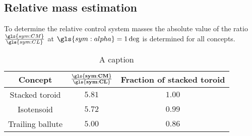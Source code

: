 \subsection{Relative mass estimation}
\label{subsec:controlmassest}
To determine the relative control system masses the absolute value of the ratio $\frac{\gls{sym:CM}}{\gls{sym:CL}}$ at $\gls{sym:alpha}=1\deg$ is determined for all concepts.
\begin{table}[h]
	\centering
	\caption{A caption}
	\begin{tabular}{|c|c|c|}
		\hline
		\textbf{Concept} & $\mathbf{\frac{\gls{sym:CM}}{\gls{sym:CL}}}$ & \textbf{Fraction of stacked toroid} \\ \hline \hline
		Stacked toroid & $5.81$ & $1.00$\\
		Isotensoid & $5.72$ & $0.99$\\
		Trailing ballute & $5.00$ & $0.86$\\
		\hline
	\end{tabular}
	\label{tab:controlmass}
\end{table}
